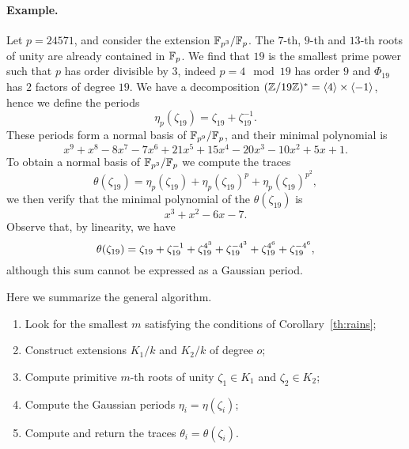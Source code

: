 \documentclass{article}
\begin{document}
\paragraph{Example.} Let $p=24571$, and consider the extension
$\mathbb{F}_{p^3}/\mathbb{F}_p$. The $7$-th, $9$-th and $13$-th roots of unity are
already contained in $\mathbb{F}_p$. We find that $19$ is the smallest prime
power such that $p$ has order divisible by $3$, indeed $p=4\mod 19$
has order $9$ and $\Phi_{19}$ has $2$ factors of degree $19$. We have
a decomposition
$(\mathbb{Z}/19\mathbb{Z})^\ast=\langle4\rangle\times\langle-1\rangle$, hence we
define the periods
\begin{equation}
  \eta_p(\zeta_{19}) = \zeta_{19} + \zeta_{19}^{-1}.
\end{equation}
These periods form a normal basis of $\mathbb{F}_{p^9}/\mathbb{F}_p$, and their
minimal polynomial is
\begin{equation}
  x^9 + x^8 - 8x^7 - 7x^6 + 21x^5 +
  15x^4 - 20x^3 - 10x^2 + 5x + 1.
\end{equation}
To obtain a normal basis of $\mathbb{F}_{p^3}/\mathbb{F}_p$ we compute the traces
\begin{equation}
  \theta(\zeta_{19}) = \eta_p(\zeta_{19}) + \eta_p(\zeta_{19})^p + \eta_p(\zeta_{19})^{p^2},
\end{equation}
we then verify that the minimal polynomial of the $\theta(\zeta_{19})$ is 
\begin{equation}
  x^3 + x^2 - 6x - 7.
\end{equation}
Observe that, by linearity, we have
\begin{equation}
  \def\z{\zeta_{19}}
  \theta(\zeta_{19}) = \z + \z^{-1} + \z^{4^3} + \z^{-4^3} + \z^{4^6} + \z^{-4^6},
\end{equation}
although this sum cannot be expressed as a Gaussian period.

Here we summarize the general algorithm.

\begin{enumerate}
\item Look for the smallest $m$ satisfying the conditions of
  Corollary~\ref{th:rains};
\item Construct extensions $K_1/k$ and $K_2/k$ of degree $o$;
\item Compute primitive $m$-th roots of unity $\zeta_1\in K_1$ and
  $\zeta_2\in K_2$;
\item Compute the Gaussian periods $\eta_i=\eta(\zeta_i)$;
\item Compute and return the traces $\theta_i=\theta(\zeta_i)$.
\end{enumerate}
\end{document}
